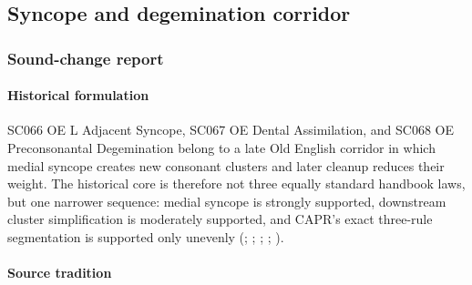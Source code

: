 \documentclass[
  british,
  a4paper,
]{article}
\begin{document}
\subsection{Syncope and degemination
corridor}\label{syncope-and-degemination-corridor}

\subsubsection{Sound-change report}\label{sound-change-report-42}

\paragraph{Historical formulation}\label{historical-formulation-42}

SC066 OE L Adjacent Syncope, SC067 OE Dental Assimilation, and SC068 OE
Preconsonantal Degemination belong to a late Old English corridor in
which medial syncope creates new consonant clusters and later cleanup
reduces their weight. The historical core is therefore not three equally
standard handbook laws, but one narrower sequence: medial syncope is
strongly supported, downstream cluster simplification is moderately
supported, and CAPR's exact three-rule segmentation is supported only
unevenly (; ;
; ; ).

\paragraph{Source tradition}\label{source-tradition-42}
\end{document}
